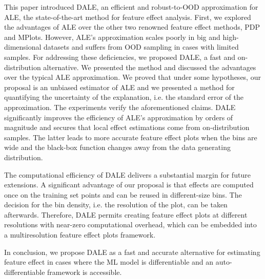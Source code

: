 This paper introduced DALE, an efficient and robust-to-OOD
approximation for ALE, the state-of-the-art method for feature effect
analysis. First, we explored the advantages of ALE over the other two
renowned feature effect methods, PDP and MPlots. However, ALE's
approximation scales poorly in big and high-dimensional datasets and
suffers from OOD sampling in cases with limited samples. For
addressing these deficiencies, we proposed DALE, a fast and
on-distribution alternative. We presented the method and discussed the
advantages over the typical ALE approximation. We proved that under
some hypotheses, our proposal is an unbiased estimator of ALE and we
presented a method for quantifying the uncertainty of the explanation,
i.e. the standard error of the approximation. The experiments verify
the aforementioned claims. DALE significantly improves the efficiency
of ALE's approximation by orders of magnitude and secures that local
effect estimations come from on-distribution samples. The latter leads
to more accurate feature effect plots when the bins are wide and the
black-box function changes away from the data generating distribution.

The computational efficiency of DALE delivers a substantial margin for
future extensions. A significant advantage of our proposal is that
effects are computed once on the training set points and can be reused
in different-size bins. The decision for the bin density, i.e. the
resolution of the plot, can be taken afterwards. Therefore, DALE
permits creating feature effect plots at different resolutions with
near-zero computational overhead, which can be embedded into a
multiresolution feature effect plots framework.

In conclusion, we propose DALE as a fast and accurate alternative for
estimating feature effect in cases where the ML model is
differentiable and an auto-differentiable framework is accessible.